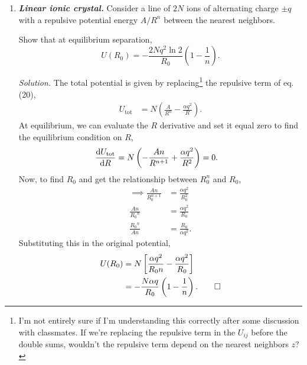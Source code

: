 \documentclass{homework}
\newcommand{\solution}{	\vspace{1em} \textit{Solution.} \quad }
\begin{document}
\begin{enumerate}
			\solution Using $R_0=\SI{3.659}{\angstrom}$ as the observed interatomic distance in metallic sodium and $\alpha = 1.747565$ from p. 65, the Madelung energy is given by \begin{align*}
				U_{\mathrm{Madelung}} & = -N \alpha q^2 / R_0 \\
					& = - \frac{ (1.747565) e^2  }{4 \pi \epsilon_0 \SI{3.659}{\angstrom}} \\
					& = - \SI{6.8588}{\eV}.
			\end{align*}
			The Madelung energy is nine times greater than the electron affinity of Na, so is more likely to form a crystal than give up electrons(?)
			
		\item %
			\textbf{\textit{Linear ionic crystal.}} Consider a line of $2N$ ions of alternating charge $\pm q$ with a repulsive potential energy $A/R^n$ between the nearest neighbors. 

			Show that at equilibrium separation, $$U(R_0) = -\frac{2Nq^2 \ln 2}{R_0} \left(1 - \frac{1}{n}\right).$$ 
				
			\solution The total potential is given by replacing\footnote{I'm not entirely sure if I'm understanding this correctly after some discussion with classmates. If we're replacing the repulsive term in the $U_{ij}$ before the double sums, wouldn't the repulsive term depend on the nearest neighbors $z$?} the repulsive term of eq. (20), \begin{align*}
				U_{\mathrm{tot}} & = N \left(
					\frac{A}{R^n} - \frac{\alpha q^2}{R}
				\right).
			\end{align*}
			At equilibrium, we can evaluate the $R$ derivative and set it equal zero to find the equilibrium condition on $R$, \begin{align*}
				\dv{U_{\mathrm{tot}}}{R} & = N \left(
					-\frac{An}{R^{n+1}} 
					+ \frac{\alpha q^2}{R^2}
				\right) = 0.
			\end{align*}
			Now, to find $R_0$ and get the relationship between $R_0^n$ and $R_0$,
			\begin{align*}
				\implies \frac{An}{R_0^{n+1}} & = \frac{\alpha q^2}{R_0^2} \\
				\frac{An}{{R_0}^n} & = \frac{\alpha q^2}{R_0} \\
				\frac{{R_0}^n}{An} & = \frac{R_0}{\alpha q^2}.
			\end{align*}
			Substituting this in the original potential, \begin{align*}
				U(R_0) & = N \left[
					\frac{\alpha q^2}{R_0 n}
					-
					\frac{\alpha q^2}{R_0}
				\right] \\
					& = - \frac{N \alpha q}{R_0} \left(
						1 - \frac{1}{n}
					\right). \qed
			\end{align*}
				
				
	\end{enumerate}
\end{document}
